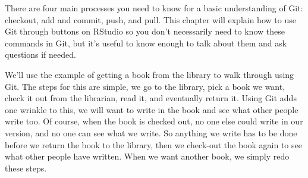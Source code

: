 \documentclass[
]{krantz}
\begin{document}
There are four main processes you need to know for a basic understanding of Git: checkout, add and commit, push, and pull. This chapter will explain how to use Git through buttons on RStudio so you don't necessarily need to know these commands in Git, but it's useful to know enough to talk about them and ask questions if needed.

We'll use the example of getting a book from the library to walk through using Git. The steps for this are simple, we go to the library, pick a book we want, check it out from the librarian, read it, and eventually return it. Using Git adds one wrinkle to this, we will want to write in the book and see what other people write too. Of course, when the book is checked out, no one else could write in our version, and no one can see what we write. So anything we write has to be done before we return the book to the library, then we check-out the book again to see what other people have written. When we want another book, we simply redo these steps.
\end{document}
